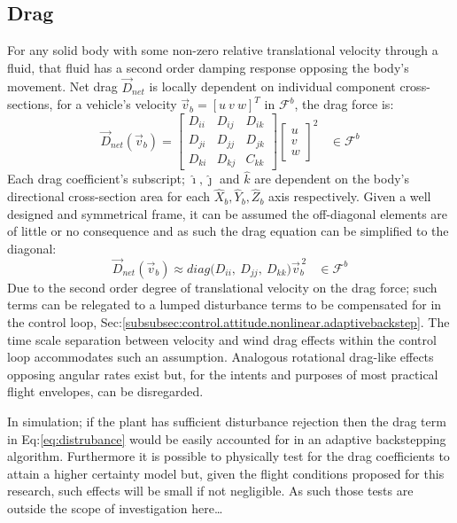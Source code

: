 \subsection{Drag}
\label{subsec:dynamics.aero.drag}
For any solid body with some non-zero relative translational velocity through a fluid, that fluid has a second order damping response opposing the body's movement. Net drag $\vec{D}_{net}$ is locally dependent on individual component cross-sections, for a vehicle's velocity $\vec{v}_b=[u~v~w]^T$ in $\mathcal{F}^b$, the drag force is:
\begin{equation}\label{eq:distrubance}
\vec{D}_{net}(\vec{v}_b)=\begin{bmatrix}
D_{ii} & D_{ij} & D_{ik}\\
D_{ji} & D_{jj} & D_{jk}\\
D_{ki} & D_{kj} & C_{kk}
\end{bmatrix}
\begin{bmatrix}
u\\
v\\
w
\end{bmatrix}^2
~~~~\in\mathcal{F}^b
\end{equation}
Each drag coefficient's subscript; $\hat{\imath},\hat{\jmath}$ and $\hat{k}$ are dependent on the body's directional cross-section area for each $\hat{X}_b,\hat{Y}_b,\hat{Z}_b$ axis respectively. Given a well designed and symmetrical frame, it can be assumed the off-diagonal elements are of little or no consequence and as such the drag equation can be simplified to the diagonal:
\begin{equation}
\vec{D}_{net}(\vec{v}_b)\approx diag\big(D_{ii},~D_{jj},~D_{kk}\big)\vec{v}_b^{\hspace{2pt}2}~~~~\in\mathcal{F}^b
\end{equation}
Due to the second order degree of translational velocity on the drag force; such terms can be relegated to a lumped disturbance terms to be compensated for in the control loop, Sec:\ref{subsubsec:control.attitude.nonlinear.adaptivebackstep}. The time scale separation between velocity and wind drag effects within the control loop accommodates such an assumption. Analogous rotational drag-like effects opposing angular rates exist but, for the intents and purposes of most practical flight envelopes, can be disregarded.
\par
In simulation; if the plant has sufficient disturbance rejection then the drag term in Eq:\ref{eq:distrubance} would be easily accounted for in an adaptive backstepping algorithm. Furthermore it is possible to physically test for the drag coefficients to attain a higher certainty model but, given the flight conditions proposed for this research, such effects will be small if not negligible. As such those tests are outside the scope of investigation here\ldots
